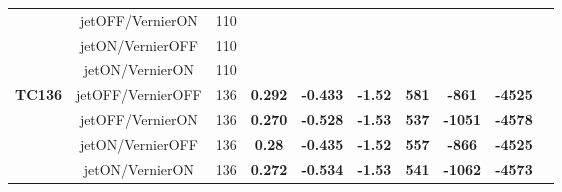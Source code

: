 \documentclass[12pt]{article}
\begin{document}
\begin{table}[H]
{\begin{tabular}{|c|c|c|c|c|c|c|c|c|c|}
                                & jetOFF/VernierON  & 110 & & & & & & \\ \cline{2-9}
                                & jetON/VernierOFF  & 110 & & & & & & \\ \cline{2-9}
                                & jetON/VernierON   & 110 & & & & & & \\ \hline \hline
%                        
\multirow{4}{*}{\textbf{TC136}} & jetOFF/VernierOFF & 136 & \textbf{0.292} & \textbf{-0.433} & \textbf{-1.52 }& \textbf{581} & \textbf{-861} & \textbf{-4525} \\ \cline{2-9}
                       & jetOFF/VernierON  & 136 & \textbf{0.270} & \textbf{-0.528} & \textbf{-1.53} & \textbf{537} & \textbf{-1051} & \textbf{-4578} \\ \cline{2-9}
                       & jetON/VernierOFF  & 136 & \textbf{0.28}  & \textbf{-0.435} & \textbf{-1.52} & \textbf{557} & \textbf{-866}  & \textbf{-4525} \\ \cline{2-9}
                       & jetON/VernierON   & 136 & \textbf{0.272} & \textbf{-0.534} & \textbf{-1.53} & \textbf{541} & \textbf{-1062} & \textbf{-4573} \\ \hline
%
\end{tabular}}
\end{table}
\end{document}
